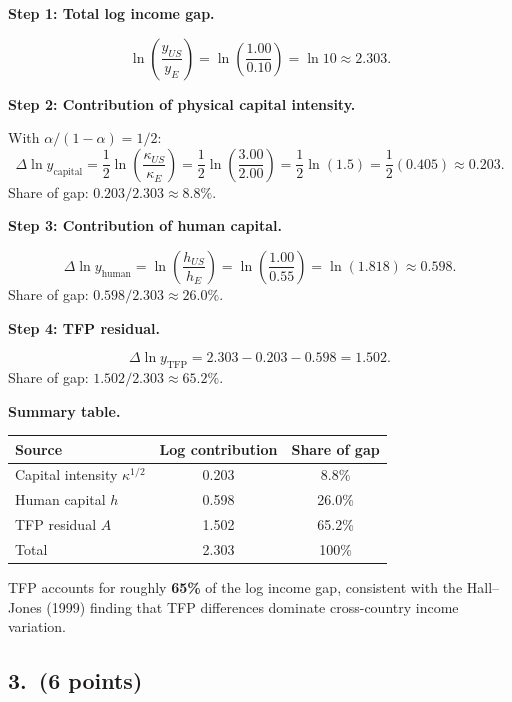 \documentclass[a4paper,11pt]{article}
\begin{document}
\begin{answerbox}
\textbf{Step 1: Total log income gap.}

\[
    \ln\!\left(\frac{y_{US}}{y_E}\right) = \ln\!\left(\frac{1.00}{0.10}\right) = \ln 10 \approx 2.303.
\]

\textbf{Step 2: Contribution of physical capital intensity.}

With $\alpha/(1-\alpha) = 1/2$:
\[
    \Delta\ln y_{\text{capital}} = \frac{1}{2}\ln\!\left(\frac{\kappa_{US}}{\kappa_E}\right)
    = \frac{1}{2}\ln\!\left(\frac{3.00}{2.00}\right)
    = \frac{1}{2}\ln(1.5) = \frac{1}{2}(0.405) \approx 0.203.
\]
Share of gap: $0.203 / 2.303 \approx \mathbf{8.8\%}$.

\textbf{Step 3: Contribution of human capital.}

\[
    \Delta\ln y_{\text{human}} = \ln\!\left(\frac{h_{US}}{h_E}\right)
    = \ln\!\left(\frac{1.00}{0.55}\right) = \ln(1.818) \approx 0.598.
\]
Share of gap: $0.598 / 2.303 \approx \mathbf{26.0\%}$.

\textbf{Step 4: TFP residual.}

\[
    \Delta\ln y_{\text{TFP}} = 2.303 - 0.203 - 0.598 = 1.502.
\]
Share of gap: $1.502 / 2.303 \approx \mathbf{65.2\%}$.

\textbf{Summary table.}

\begin{center}
\begin{tabular}{lcc}
\toprule
Source & Log contribution & Share of gap \\
\midrule
Capital intensity $\kappa^{1/2}$ & 0.203 & 8.8\% \\
Human capital $h$                & 0.598 & 26.0\% \\
TFP residual $A$                 & 1.502 & 65.2\% \\
\midrule
Total                            & 2.303 & 100\% \\
\bottomrule
\end{tabular}
\end{center}

TFP accounts for roughly \textbf{65\%} of the log income gap, consistent with the
Hall--Jones (1999) finding that TFP differences dominate cross-country income variation.
\end{answerbox}

\subsection*{3.\ (6 points)}
\end{document}
